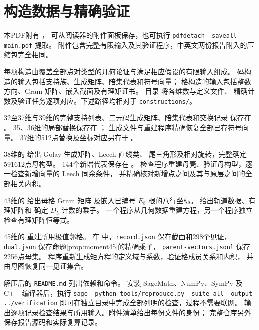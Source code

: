 \section{构造数据与精确验证}\label{app:data}

本PDF附有
，
可从阅读器的附件面板保存，也可执行
\texttt{pdfdetach -saveall main.pdf} 提取。
附件包含完整有限输入及其验证程序，中英文两份报告附入的压缩包完全相同。

每项构造由覆盖全部点对类型的几何论证与满足相应假设的有限输入组成。
码构造的输入包括支持族、生成矩阵、陪集代表和符号向量；
格构造的输入包括整数方向、Gram 矩阵、嵌入截面及有理矩证书。
目录  将各维数与定义文件、
精确计数及验证任务逐项对应。下述路径均相对于 \texttt{constructions/}。

32至37维与39维的完整支持列表、二元码生成矩阵、陪集代表和交换记录
保存在 。
35、36维的局部替换保存在 ；
生成文件与重建程序精确恢复全部已存符号向量。
37维的512点替换及坐标对应另存于 。

38维的  给出 Golay 生成矩阵、Leech 直线类、
尾三角形及相对旋转，完整确定591612点母构型。
144个新增代表保存在 。
检查程序重建母壳、验证母构型，逐一检查新增向量的 Leech 同余条件，
并精确核对新增点之间及其与原层之间的全部相关内积。

43维的  给出母格 Gram 矩阵
及嵌入已编号 $E_8$ 根的八行坐标。
 给出轨道数据、有理矩阵和
确定 $D_5$ 计数的乘子。
一个程序从几何数据重建方程，另一个程序独立检查有理矩阵恒等式。

45维的  重建所用极值邻格。
在  中，\texttt{record.json} 保存截面和298个见证，
\texttt{dual.json} 保存命题\ref{prop:moment45}的精确乘子，
\texttt{parent-vectors.jsonl} 保存2256点母集。
程序重新生成矩方程的定义域与系数，验证格成员关系和内积，
并由母图恢复同一见证集合。

解压后的 \texttt{README.md} 列出依赖和命令。
安装 SageMath、NumPy、SymPy 及 C++ 编译器后，执行
\texttt{sage -python tools/reproduce.py --suite all --output ../verification}
即可在独立目录中完成全部列明的检查，过程不需要联网。
输出逐项记录检查结果与所用输入。附件清单给出每份文件的身份；
完整仓库另外保存报告源码和实际复算记录。
